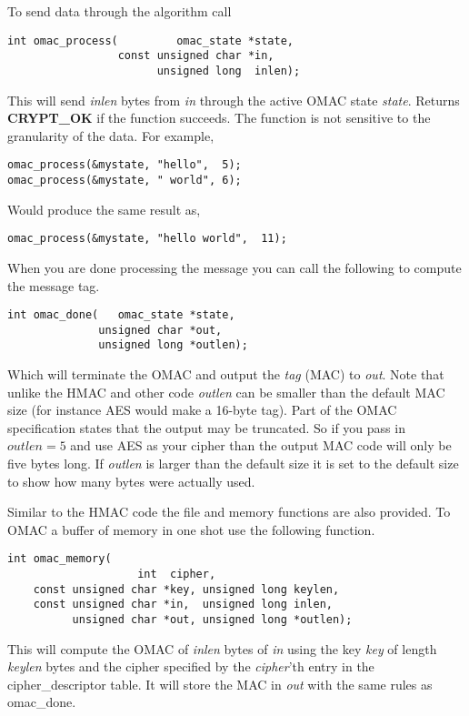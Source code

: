 \documentclass[synpaper]{book}
\begin{document}
To send data through the algorithm call
\begin{verbatim}
int omac_process(         omac_state *state,
                 const unsigned char *in,
                       unsigned long  inlen);
\end{verbatim}
This will send \textit{inlen} bytes from \textit{in} through the active OMAC state \textit{state}.  Returns \textbf{CRYPT\_OK} if the
function succeeds.  The function is not sensitive to the granularity of the data.  For example,

\begin{verbatim}
omac_process(&mystate, "hello",  5);
omac_process(&mystate, " world", 6);
\end{verbatim}

Would produce the same result as,

\begin{verbatim}
omac_process(&mystate, "hello world",  11);
\end{verbatim}

When you are done processing the message you can call the following to compute the message tag.

\begin{verbatim}
int omac_done(   omac_state *state,
              unsigned char *out,
              unsigned long *outlen);
\end{verbatim}
Which will terminate the OMAC and output the \textit{tag} (MAC) to \textit{out}.  Note that unlike the HMAC and other code
\textit{outlen} can be smaller than the default MAC size (for instance AES would make a 16-byte tag).  Part of the OMAC
specification states that the output may be truncated.  So if you pass in $outlen = 5$ and use AES as your cipher than
the output MAC code will only be five bytes long.  If \textit{outlen} is larger than the default size it is set to the default
size to show how many bytes were actually used.

Similar to the HMAC code the file and memory functions are also provided.  To OMAC a buffer of memory in one shot use the
following function.

\begin{verbatim}
int omac_memory(
                    int  cipher,
    const unsigned char *key, unsigned long keylen,
    const unsigned char *in,  unsigned long inlen,
          unsigned char *out, unsigned long *outlen);
\end{verbatim}
This will compute the OMAC of \textit{inlen} bytes of \textit{in} using the key \textit{key} of length \textit{keylen} bytes and the cipher
specified by the \textit{cipher}'th entry in the cipher\_descriptor table.  It will store the MAC in \textit{out} with the same
rules as omac\_done.
\end{document}
